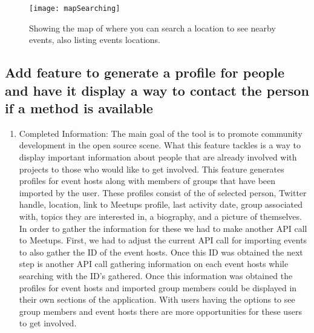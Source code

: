 \documentclass[draftclsnofoot,10pt,onecolumn]{IEEEtran} %
\begin{document}
\begin{figure}[H]
  \begin{center}
  
  \texttt{[image: mapSearching]}
  \captionsetup{width=.4\linewidth}
  \centering
  \caption{Showing the map of where you can search a location to see nearby events, also listing events locations. }

  \end{center}
\end{figure}

\subsection{Add feature to generate a profile for people and have it display a way to contact the person if a method is available}
\begin{enumerate}

  \item Completed Information: The main goal of the tool is to promote community
    development in the open source scene. What this feature tackles is a way to display
    important information about people that are already involved with projects to those
    who would like to get involved. This feature generates profiles for event hosts along
    with members of groups that have been imported by the user. These profiles consist of 
    the of selected person, Twitter handle, location, link to Meetups profile, last activity date, 
    group associated with, topics they are interested in, a biography, and a picture of themselves.
    In order to gather the information for these we had to make another API call to Meetups. First,
    we had to adjust the current API call for importing events to also gather the ID of the event hosts.
    Once this ID was obtained the next step is another API call gathering information on each event hosts
    while searching with the ID's gathered. Once this information was obtained the profiles for event
    hosts and imported group members could be displayed in their own sections of the application.
    With users having the options to see group members and event hosts there are more opportunities
    for these users to get involved.

\end{enumerate}
\end{document}
